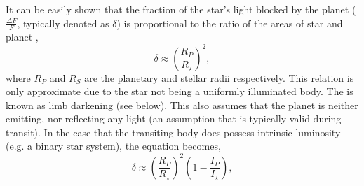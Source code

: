 It can be easily shown that the fraction of the star's light blocked by the planet ($\frac{\Delta F}{F}$, typically denoted as $\delta$) is proportional to the ratio of the areas of star and planet \citep{Winn2010},
\begin{equation}
\delta \approx \left(\frac{R_{P}}{R_{\star}}\right)^{2},
\label{eq:tran_dep}
\end{equation}
where $R_{P}$ and $R_{S}$ are the planetary and stellar radii respectively. This relation is only approximate due to the star not being a uniformly illuminated body. The is known as limb darkening (see below). This also assumes that the planet is neither emitting, nor reflecting any light (an assumption that is typically valid during transit). In the case that the transiting body does possess intrinsic luminosity (e.g. a binary star system), the equation becomes, 
\begin{equation}
\delta \approx \left(\frac{R_{P}}{R_{\star}}\right)^{2}\left(1-\frac{I_{P}}{I_{\star}}\right),
\label{eq:tran_dep_I}
\end{equation}

